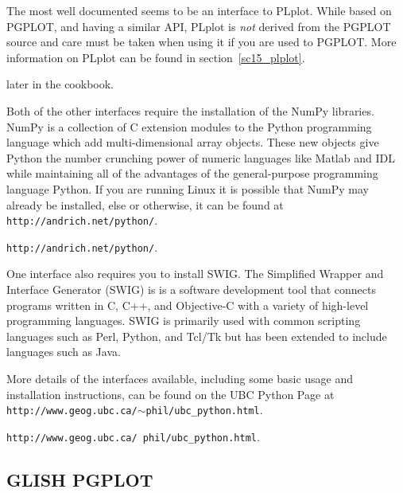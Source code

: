 \documentclass[twoside,11pt]{article}
\newcommand{\htmladdnormallink}[2]{#1}
\newcommand{\htmlref}[2]{#1}
\newcommand{\latex}[1]{#1}
\newcommand{\xlabel}[1]{}
\begin{document}
The most well documented seems to be an interface to \htmladdnormallink{PLplot}{http://emma.la.asu.edu/plplot/}. While based on PGPLOT, and having a similar API, PLplot is {\em not} derived from the PGPLOT source and care must be taken when using it if you are used to PGPLOT. More information on PLplot can be found \latex{ in section~\ref{sc15_plplot}.}
\begin{htmlonly}
\htmlref{later}{sc15_plplot} in the cookbook.
\end{htmlonly}

Both of the other interfaces require the installation of the \htmladdnormallink{NumPy}{http://www.python.org/topics/scicomp/numpy.html}
libraries. NumPy is a collection of C extension modules to the Python programming language which add  multi-dimensional array objects. These new objects give Python the number crunching power of numeric languages like Matlab and IDL while maintaining all of the advantages of the general-purpose programming language Python. If you are running Linux it is possible that NumPy may already be installed, else or otherwise, it can be found at \latex{{\tt http://andrich.net/python/}.}
\begin{htmlonly} \htmladdnormallink{{\tt http://andrich.net/python/}}{http://andrich.net/python/}.
\end{htmlonly} 

One interface also requires you to install \htmladdnormallink{SWIG}{http://www.swig.org/}. The Simplified Wrapper and Interface Generator (SWIG) is is a software development tool that connects programs written in C, C++, and Objective-C with a variety of high-level programming languages. SWIG is primarily used with common scripting languages such as Perl, Python, and Tcl/Tk but has been extended to include languages such as Java.

More details of the interfaces available, including some basic usage and installation instructions, can be found on the UBC Python Page at \latex{{\tt http://www.geog.ubc.ca/$\sim$phil/ubc\_python.html}.}
\begin{htmlonly} \htmladdnormallink{{\tt http://www.geog.ubc.ca/~phil/ubc_python.html}}{http://www.geog.ubc.ca/~phil/ubc_python.html}.
\end{htmlonly}

\subsection{\xlabel{sc15_pgglish}GLISH PGPLOT\label{sc15_pgglish}}
\end{document}
